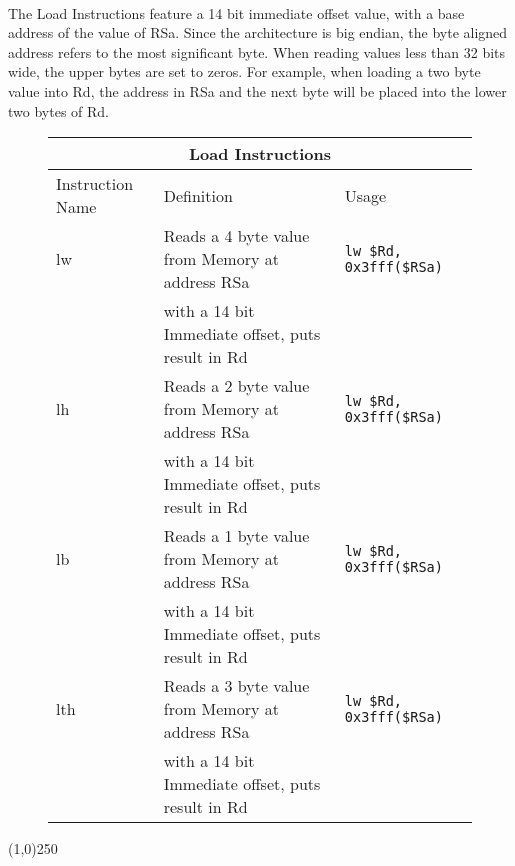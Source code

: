 \documentclass[letterpaper, 11pt]{article}
\begin{document}
\paragraph{} The Load Instructions feature a 14 bit immediate offset value, with a base address of the value of RSa. Since the architecture is big endian,
the byte aligned address refers to the most significant byte. When reading values less than 32 bits wide, the upper bytes are set to zeros. For example, when loading
a two byte value into Rd, the address in RSa and the next byte will be placed into the lower two bytes of Rd.
\begin{figure}[!h]
	\begin{center}
		\begin{tabular}{|l|l|l|}
			\hline
			\multicolumn{3}{c}{Load Instructions} \\ \hline
			Instruction Name	& Definition											& Usage 							\\ \hline
			lw					& Reads a 4 byte value from Memory at address RSa 		& \texttt{lw \$Rd, 0x3fff(\$RSa)}	\\ 
			\hfill				& with a 14 bit Immediate offset, puts result in Rd		& \hfill 							\\ \hline
			lh					& Reads a 2 byte value from Memory at address RSa 		& \texttt{lw \$Rd, 0x3fff(\$RSa)}	\\ 
			\hfill				& with a 14 bit Immediate offset, puts result in Rd		& \hfill 							\\ \hline			
			lb					& Reads a 1 byte value from Memory at address RSa 		& \texttt{lw \$Rd, 0x3fff(\$RSa)}	\\ 
			\hfill				& with a 14 bit Immediate offset, puts result in Rd		& \hfill 							\\ \hline			
			lth					& Reads a 3 byte value from Memory at address RSa 		& \texttt{lw \$Rd, 0x3fff(\$RSa)}	\\ 
			\hfill				& with a 14 bit Immediate offset, puts result in Rd		& \hfill 							\\ \hline			
		
		\end{tabular} 
	\end{center}
	
\end{figure}

\begin{center}
	\line(1,0){250}
\end{center}
\end{document}
